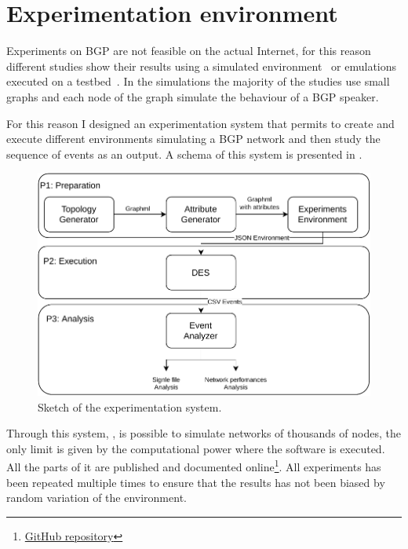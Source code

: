 \chapter{Experimentation environment}
\label{cha:des}

Experiments on \ac{BGP} are not feasible on the actual Internet, for this
reason different studies show their results using a simulated environment~\cite{griffin2001experimental}
or emulations executed on a testbed~\cite{milani2020improving}.
In the simulations the majority of the studies use small graphs and each node
of the graph simulate the behaviour of a \ac{BGP} speaker.

For this reason I designed an experimentation system that permits to create and execute
different environments simulating a \ac{BGP} network and then study the sequence
of events as an output.
A schema of this system is presented in .

\begin{figure}[ht]
    \centering
    \includegraphics[scale=0.75]{images/toolchain.pdf}
    \caption{Sketch of the experimentation system.}
    \label{fig:exp_sketch}
\end{figure}

Through this system, , is possible to simulate networks
of thousands of nodes, the only limit is given by the computational power where
the software is executed.
All the parts of it are published and documented
online\footnote{\href{https://github.com/tiamilani/BGPFSM}{GitHub repository}}.
All experiments has been repeated multiple times to ensure that the results
has not been biased by random variation of the environment.

